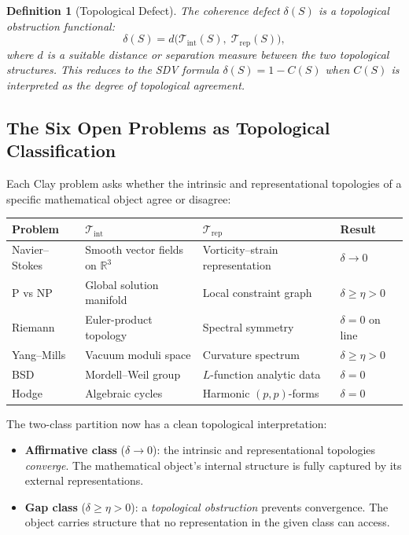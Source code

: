 \documentclass[11pt]{article}
\newtheorem{definition}[theorem]{Definition}
\begin{document}
\begin{definition}[Topological Defect]
The coherence defect $\delta(S)$ is a topological obstruction functional:
\[
  \delta(S) = d\bigl(\mathcal{T}_{\mathrm{int}}(S),\;
  \mathcal{T}_{\mathrm{rep}}(S)\bigr),
\]
where $d$ is a suitable distance or separation measure between the two
topological structures.  This reduces to the SDV formula
$\delta(S) = 1 - C(S)$ when $C(S)$ is interpreted as the degree of
topological agreement.
\end{definition}

\subsection{The Six Open Problems as Topological Classification}
\label{subsec:topo-classification}

Each Clay problem asks whether the intrinsic and representational topologies
of a specific mathematical object agree or disagree:

\begin{center}
\renewcommand{\arraystretch}{1.3}
\begin{tabular}{@{}lp{3.2cm}p{3.5cm}p{2.2cm}@{}}
\toprule
\textbf{Problem} & $\mathcal{T}_{\mathrm{int}}$ & $\mathcal{T}_{\mathrm{rep}}$ & \textbf{Result} \\
\midrule
Navier--Stokes & Smooth vector fields on $\mathbb{R}^3$ & Vorticity--strain representation & $\delta \to 0$ \\
P vs NP & Global solution manifold & Local constraint graph & $\delta \geq \eta > 0$ \\
Riemann & Euler-product topology & Spectral symmetry & $\delta = 0$ on line \\
Yang--Mills & Vacuum moduli space & Curvature spectrum & $\delta \geq \eta > 0$ \\
BSD & Mordell--Weil group & $L$-function analytic data & $\delta = 0$ \\
Hodge & Algebraic cycles & Harmonic $(p,p)$-forms & $\delta = 0$ \\
\bottomrule
\end{tabular}
\end{center}

\noindent
The two-class partition now has a clean topological interpretation:

\begin{itemize}
\item \textbf{Affirmative class} ($\delta \to 0$): the intrinsic and
representational topologies \emph{converge}.  The mathematical object's
internal structure is fully captured by its external representations.
\item \textbf{Gap class} ($\delta \geq \eta > 0$): a \emph{topological
obstruction} prevents convergence.  The object carries structure that no
representation in the given class can access.
\end{itemize}
\end{document}
